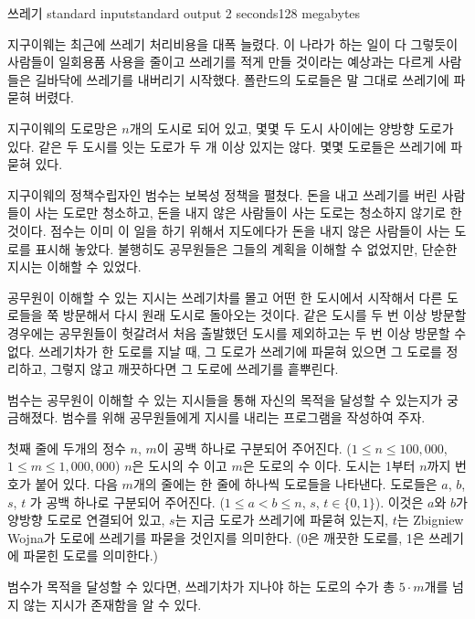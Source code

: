\begin{problem}{쓰레기}
	{standard input}{standard output}
	{2 seconds}{128 megabytes}{}
	
	
	지구이웨는 최근에 쓰레기 처리비용을 대폭 늘렸다. 이 나라가 하는 일이 다 그렇듯이 사람들이 일회용품 사용을 줄이고 쓰레기를 적게 만들 것이라는 예상과는 다르게 사람들은 길바닥에 쓰레기를 내버리기 시작했다. 폴란드의 도로들은 말 그대로 쓰레기에 파묻혀 버렸다.
	
	지구이웨의 도로망은 $n$개의 도시로 되어 있고, 몇몇 두 도시 사이에는 양방향 도로가 있다. 같은 두 도시를 잇는 도로가 두 개 이상 있지는 않다. 몇몇 도로들은 쓰레기에 파묻혀 있다.
	
	지구이웨의 정책수립자인 범수는 보복성 정책을 펼쳤다. 돈을 내고 쓰레기를 버린 사람들이 사는 도로만 청소하고, 돈을 내지 않은 사람들이 사는 도로는 청소하지 않기로 한 것이다. 점수는 이미 이 일을 하기 위해서 지도에다가 돈을 내지 않은 사람들이 사는 도로를 표시해 놓았다. 불행히도 공무원들은 그들의 계획을 이해할 수 없었지만, 단순한 지시는 이해할 수 있었다.
	
	공무원이 이해할 수 있는 지시는 쓰레기차를 몰고 어떤 한 도시에서 시작해서 다른 도로들을 쭉 방문해서 다시 원래 도시로 돌아오는 것이다. 같은 도시를 두 번 이상 방문할 경우에는 공무원들이 헛갈려서 처음 출발했던 도시를 제외하고는 두 번 이상 방문할 수 없다. 쓰레기차가 한 도로를 지날 때, 그 도로가 쓰레기에 파묻혀 있으면 그 도로를 정리하고, 그렇지 않고 깨끗하다면 그 도로에 쓰레기를 흩뿌린다.
	
	범수는 공무원이 이해할 수 있는 지시들을 통해 자신의 목적을 달성할 수 있는지가 궁금해졌다. 범수를 위해 공무원들에게 지시를 내리는 프로그램을 작성하여 주자.
	
	

	\InputFile
	
	첫째 줄에 두개의 정수 $n$, $m$이 공백 하나로 구분되어 주어진다. ($1 \le n \le 100,000$, $1 \le m \le 1,000,000$) $n$은 도시의 수 이고 $m$은 도로의 수 이다. 도시는 1부터 $n$까지 번호가 붙어 있다. 다음 $m$개의 줄에는 한 줄에 하나씩 도로들을 나타낸다. 도로들은  $a$, $b$, $s$, $t$ 가 공백 하나로 구분되어 주어진다. ($1 \le a < b \le n$, $s$, $t \in \{0,1\}$). 이것은 $a$와 $b$가 양방향 도로로 연결되어 있고, $s$는 지금 도로가 쓰레기에 파묻혀 있는지, $t$는 Zbigniew Wojna가 도로에 쓰레기를 파묻을 것인지를 의미한다. (0은 깨끗한 도로를, 1은 쓰레기에 파묻힌 도로를 의미한다.) 
	
	범수가 목적을 달성할 수 있다면, 쓰레기차가 지나야 하는 도로의 수가 총 $5\cdot m$개를 넘지 않는 지시가 존재함을 알 수 있다.
	




\end{problem}
